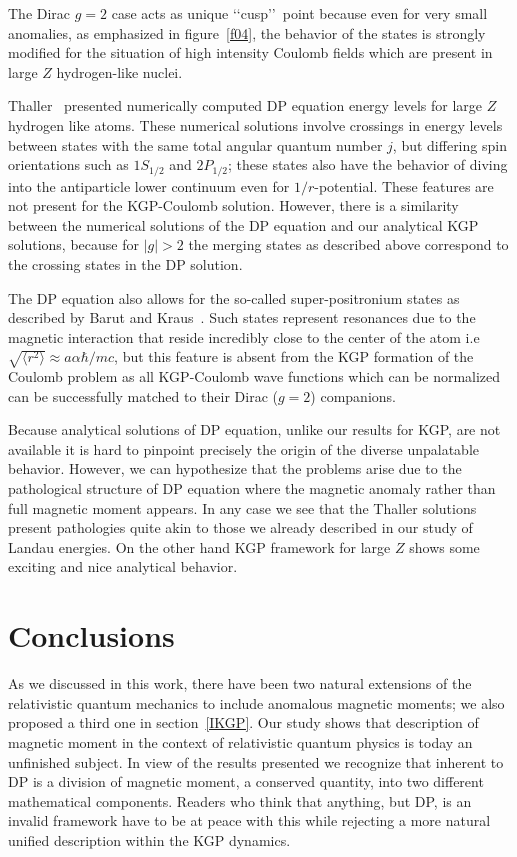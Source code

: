 \documentclass[epj]{svjour}
\begin{document}
The Dirac $g=2$ case acts as unique \lq\lq cusp\rq\rq\ point because even for very small anomalies, as emphasized in figure~\ref{f04}, the behavior of the states is strongly modified for the situation of high intensity Coulomb fields which are present in large $Z$ hydrogen-like nuclei.

Thaller~\cite{Thaller:1992ji} presented numerically computed DP equation energy levels for large $Z$ hydrogen like atoms. These numerical solutions involve crossings in energy levels between states with the same total angular quantum number $j$, but differing spin orientations such as $1S_{1/2}$ and $2P_{1/2}$; these states also have the behavior of diving into the antiparticle lower continuum even for $1/r$-potential. These features are not present for the KGP-Coulomb solution. However, there is a similarity between the numerical solutions of the DP equation and our analytical KGP solutions, because for $|g|>2$ the merging states as described above correspond to the crossing states in the DP solution.

The DP equation also allows for the so-called super-positronium states as described by Barut and Kraus~\cite{Barut:1975hz,Barut:1976hs}. Such states represent resonances due to the magnetic interaction that reside incredibly close to the center of the atom i.e $\sqrt{\langle r^{2}\rangle}\approx a\alpha\hbar/mc$, but this feature is absent from the KGP formation of the Coulomb problem as all KGP-Coulomb wave functions which can be normalized can be successfully matched to their Dirac ($g=2$) companions.

Because analytical solutions of DP equation, unlike our results for KGP, are not available it is hard to pinpoint precisely the origin of the diverse unpalatable behavior. However, we can hypothesize that the problems arise due to the pathological structure of DP equation where the magnetic anomaly rather than full magnetic moment appears. In any case we see that the Thaller solutions present pathologies quite akin to those we already described in our study of Landau energies. On the other hand KGP framework for large $Z$ shows some exciting and nice analytical behavior.

\section{Conclusions} \label{concl}
As we discussed in this work, there have been two natural extensions of the relativistic quantum mechanics to include anomalous magnetic moments; we also proposed a third one in section~\ref{IKGP}. Our study shows that description of magnetic moment in the context of relativistic quantum physics is today an unfinished subject. In view of the results presented we recognize that inherent to DP is a division of magnetic moment, a conserved quantity, into two different mathematical components. Readers who think that anything, but DP, is an invalid framework have to be at peace with this while rejecting a more natural unified description within the KGP dynamics.
\end{document}

